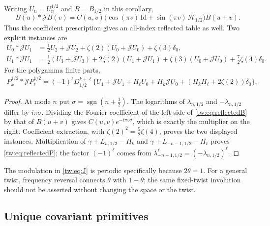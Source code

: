 \begin{corollary}
\label{tw:cor:reflection}
Writing $U_n=U_n^{1/2}$ and $B=B_{1/2}$ in this corollary,
\begin{equation}\label{tw:eq:reflectedB}
 B(u)*\mathcal J B(v)
  =C(u,v)\bigl(\cos(\pi v)\,\mathrm{Id}
                   +\sin(\pi v)\,\mathcal H_{1/2}\bigr)B(u+v).
\end{equation}
Thus the coefficient prescription gives an all-index reflected
table as well. Two explicit instances are
\begin{align}
 U_0*\mathcal J U_1
  &=\tfrac12 U_2+\mathcal J U_2
        +\zeta(2)(U_0+\mathcal J U_0)+\zeta(3)\delta_0,
 \label{tw:eq:reflected01}\\
 U_1*\mathcal J U_1
  &=\tfrac12(U_3+\mathcal J U_3)
        +2\zeta(2)(U_1+\mathcal J U_1)
        +\zeta(3)(U_0+\mathcal J U_0)
        +\tfrac72\zeta(4)\delta_0.
 \label{tw:eq:reflected11}
\end{align}
For the polygamma finite parts,
\begin{align}
 P_k^{1/2}*\mathcal J P_\ell^{1/2}
 =(-1)^\ell D_{1/2}^{k+\ell}\bigl\{
     U_1+\mathcal J U_1+H_\ell U_0+H_k\mathcal J U_0
               +(H_kH_\ell+2\zeta(2))\delta_0\bigr\}.
 \label{tw:eq:reflectedP}
\end{align}
\end{corollary}

\begin{proof}
At mode $n$ put $\sigma=\operatorname{sgn}(n+\tfrac12)$. The
logarithms of $\lambda_{n,1/2}$ and $-\lambda_{n,1/2}$ differ by
$i\pi\sigma$. Dividing the Fourier coefficient of the left side
of \eqref{tw:eq:reflectedB} by that of $B(u+v)$ gives
$C(u,v)e^{-i\pi v\sigma}$, which is exactly the multiplier on
the right. Coefficient extraction, with
$\zeta(2)^2=\tfrac52\zeta(4)$, proves the two displayed
instances. Multiplication of
$\gamma+L_{n,1/2}-H_k$ and
$\gamma+L_{-n-1,1/2}-H_\ell$ proves
\eqref{tw:eq:reflectedP}; the factor $(-1)^\ell$ comes from
$\lambda_{-n-1,1/2}^{\ell}=(-\lambda_{n,1/2})^\ell$.
\end{proof}

The modulation in \eqref{tw:eq:J} is periodic specifically because
$2\theta=1$. For a general twist, frequency reversal connects
$\theta$ with $1-\theta$; the same fixed-twist involution should
not be asserted without changing the space or the twist.

\subsection{Unique covariant primitives}

